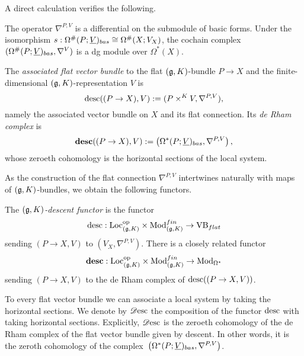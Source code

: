 A direct calculation verifies the following. 

\begin{lemma} 
The operator $\nabla^{P,V}$ is a differential on the submodule of basic forms.
Under the isomorphism $s: \Omega^{\#}(P; \underline{V})_{bas} \cong \Omega^{\#}(X;
V_X)$, the cochain complex $(\Omega^{\#}(P; \underline{V})_{bas}, \nabla^V)$ is a
dg module over $\Omega^*(X)$. 
\end{lemma}


\begin{dfn}\label{def desc}
The {\em associated flat vector bundle} to the flat $(\mathfrak g,K)$-bundle $P \to X$ and the finite-dimensional $(\mathfrak g,K)$-representation $V$ is 
\[
{\rm desc}((P\to X),V) := (P \times^K V, \nabla^{P,V}),
\]
namely the associated vector bundle on $X$ and its flat connection.
Its {\em de Rham complex} is
\[
\mathbf{desc}((P \to X), V) := \left(\Omega^*(P; \underline{V})_{bas}, \nabla^{P,V}\right),
\]
whose zeroeth cohomology is the horizontal sections of the local system.
\end{dfn}

As the construction of the flat connection $\nabla^{P,V}$ intertwines naturally with maps of $(\mathfrak g,K)$-bundles, 
we obtain the following functors.

\begin{dfn}
The {\em $(\mathfrak g,K)$-descent functor} is the functor 
\[
{\rm desc}: {\rm Loc}_{(\mathfrak g,K)}^{{\rm op}} \times {\rm Mod}^{fin}_{(\mathfrak g,K)} \to {\rm VB}_{flat}
\]
sending $(P \to X, V)$ to $(V_X,\nabla^{P,V})$.
There is a closely related functor
\[
\mathbf{desc}: {\rm Loc}_{(\mathfrak g,K)}^{{\rm op}} \times {\rm Mod}^{fin}_{(\mathfrak g,K)} \to {\rm Mod}_{\Omega^*}
\]
sending $(P \to X, V)$ to the de Rham complex of ${\rm desc}((P \to X,V))$. 
\end{dfn}

To every flat vector bundle we can associate a local system by taking
the horizontal sections. We denote by $\mathscr{D}{\rm esc}$ the
composition of the functor ${\rm desc}$ with taking horizontal
sections. Explicitly, $\mathscr{D}{\rm esc}$ is the zeroeth cohomology of the de
Rham complex of the flat vector bundle given by descent. In other words, it is
the zeroth cohomology of the complex~$\left(\Omega^*(P;  \underline{V})_{bas}, \nabla^{P,V}\right)$.

